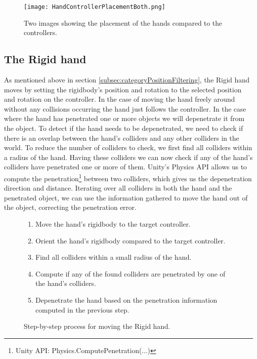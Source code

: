 \begin{figure}[h]
\centering
\texttt{[image: HandControllerPlacementBoth.png]}
\caption{Two images showing the placement of the hands compared to the controllers.}
\label{fig:handControllerPlacement}
\end{figure}

\subsection{The Rigid hand}
\label{subsec:rigidHand}
As mentioned above in section \ref{subsec:categoryPositionFiltering}, the Rigid hand moves by setting the rigidbody's position and rotation to the selected position and rotation on the controller. In the case of moving the hand freely around without any collisions occurring the hand just follows the controller. In the case where the hand has penetrated one or more objects we will depenetrate it from the object. To detect if the hand needs to be depenetrated, we need to check if there is an overlap between the hand's colliders and any other colliders in the world. To reduce the number of colliders to check, we first find all colliders within a radius of the hand. Having these colliders we can now check if any of the hand's colliders have penetrated one or more of them. Unity's Physics API allows us to compute the penetration\footnote{Unity API: Physics.ComputePenetration(...)} between two colliders, which gives us the depenetration direction and distance. Iterating over all colliders in both the hand and the penetrated object, we can use the information gathered to move the hand out of the object, correcting the penetration error.

\begin{figure}[H]
\centering
\small
\begin{enumerate}[noitemsep]
\item Move the hand's rigidbody to the target controller.
\item Orient the hand's rigidbody compared to the target controller.
\item Find all colliders within a small radius of the hand.
\item Compute if any of the found colliders are penetrated by one of the hand's colliders.
\item Depenetrate the hand based on the penetration information computed in the previous step.
\end{enumerate}
\caption{Step-by-step process for moving the Rigid hand.}
\label{fig:stepByStepRigidHand}
\end{figure}

